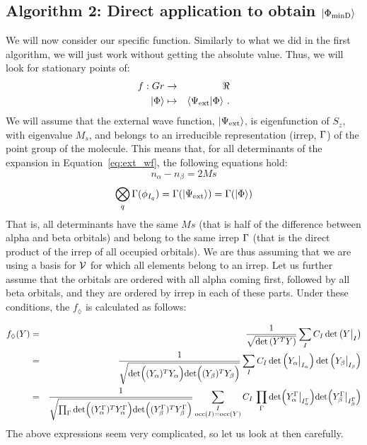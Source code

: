 \subsection{Algorithm 2: Direct application to obtain $\ket{\Phi_\text{minD}}$}
\label{sec:alg_two}

We will now consider our specific function.
Similarly to what we did in the first algorithm, we will just work without getting the absolute value.
Thus, we will look for stationary points of:
\begin{eqnarray}
  f : Gr &\to& \real\\
  \ket{\Phi} &\mapsto& \innerproduct{\Psi_\text{ext}}{\Phi}\,.
\end{eqnarray}
We will assume that the external wave function, $\ket{\Psi_\text{ext}}$, is eigenfunction of $S_z$, with eigenvalue $M_s$, and belongs to an irreducible representation (irrep, $\Gamma$) of the point group of the molecule.
This means that, for all determinants of the expansion in Equation~\eqref{eq:ext_wf}, the following equations hold:
\begin{equation}
  n_\alpha - n_\beta = 2 Ms
\end{equation}
\begin{equation}\label{eq:irrep_condition}
  \bigotimes_q \Gamma(\phi_{I_q}) = \Gamma(\ket{\Psi_\text{ext}}) = \Gamma(\ket{\Phi})
\end{equation}
That is, all determinants have the same $Ms$ (that is half of the difference between alpha and beta orbitals) and belong to the same irrep $\Gamma$ (that is the direct product of the irrep of all occupied orbitals).
We are thus assuming that we are using a basis for $\mathcal{V}{}$ for which all elements belong to an irrep.
Let us further assume that the orbitals are ordered with all alpha coming first, followed by all beta orbitals, and they are ordered by irrep in each of these parts.
Under these conditions, the $f_\lozenge$ is calculated as follows:

\begin{eqnarray}
  \label{eq:gen_f}
  f_\lozenge(Y)
  &=& \frac{1}{\sqrt{\text{det} \left( Y^T Y \right)}}
      \sum_{I} C_I \, \text{det} \left( Y\big|_I \right)\\
  &=& \frac{1}{\sqrt{
      \text{det} \Big( (Y_\alpha)^T Y_\alpha \Big)
      \text{det} \Big( (Y_\beta)^T Y_\beta \Big)
      }}
      \sum_{I} C_I \,
      \text{det} \left( Y_\alpha\big|_{I_\alpha} \right)
      \text{det} \left( Y_\beta\big|_{I_\beta} \right)\\\label{eq:f_diam_spin_irrep}
  &=& \frac{1}{\sqrt{
      \prod_{\Gamma}
      \text{det} \Big( (Y_\alpha^{\Gamma})^T Y_\alpha^{\Gamma} \Big)
      \text{det} \Big( (Y_\beta^{\Gamma})^T Y_\beta^{\Gamma} \Big)
      }}
      \sum_{\substack{I\\\text{occ}(I) = \text{occ}(Y)}} C_I \,
  \prod_{\Gamma}
  \text{det} \Big( Y_\alpha^{\Gamma}\big|_{I_\alpha^{\Gamma}} \Big)
  \text{det} \Big( Y_\beta^{\Gamma}\big|_{I_\beta^{\Gamma}} \Big)
\end{eqnarray}
The above expressions seem very complicated, so let us look at then carefully.


